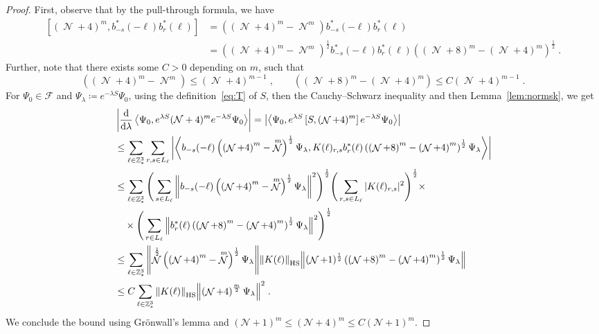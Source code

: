 \documentclass[12pt,a4paper]{article}
\numberwithin{equation}{section}
\newcommand{\cF}{\mathcal{F}}
\newcommand{\cN}{\mathcal{N}}
\newcommand{\1}{\mathbb{I}}
\newcommand{\di}{\textnormal{d}}
\newcommand{\HS}{\mathrm{HS}}
\DeclareMathOperator{\NN}{\mathcal{N}}
\newcommand{\half}{\frac{1}{2}}
\newcommand{\eva}[1]{\left\langle #1 \right\rangle}
\theoremstyle{plain}
\theoremstyle{definition}
\theoremstyle{remark}
\theoremstyle{plain}
\theoremstyle{definition}
\theoremstyle{remark}
\begin{document}
\begin{proof}
First, observe that by the pull-through formula, we have
\begin{align}
	\left[(\NN+4)^m, b^*_{-s}(-\ell)b^*_{r}(\ell)\right] &= \left( (\NN+4)^m - \NN^m \right) b^*_{-s}(-\ell)b^*_{r}(\ell) \nonumber \\
	&= \left( \left(\NN+4\right)^m - \NN^m \right)^\half b^*_{-s}(-\ell)b^*_{r}(\ell) \left( \left(\NN+8\right)^m - \left(\NN+4\right)^m \right)^\half \;.
\end{align}
Further, note that there exists some $ C > 0 $ depending on $ m $, such that
\begin{equation}
	\left( \left(\NN+4\right)^m - \NN^m \right)
	\leq \left(\NN+4\right)^{m-1} \;, \qquad
	\left( \left(\NN+8\right)^m - \left(\NN+4\right)^m \right)
	\leq C \left(\NN+4\right)^{m-1} \;.
\end{equation}
For $ \Psi_0 \in \cF $ and $ \Psi_\lambda \coloneq e^{-\lambda S} \Psi_0 $, using the definition~\eqref{eq:T} of $ S $, then the Cauchy--Schwarz inequality and then Lemma~\ref{lem:normsk}, we get
\begin{align}
	&\left|\frac{\di}{\di\lambda}\eva{\Psi_0, e^{\lambda S} (\mathcal{N}+4)^m e^{-\lambda S} \Psi_0 }\right|
	= \left| \eva{\Psi_0, e^{\lambda S} \left[S, (\NN+4)^m\right] e^{-\lambda S} \Psi_0}\right|\nonumber\\
	&\leq \sum\limits_{\ell\in \mathbb{Z}^3_*}
		\sum\limits_{r,s\in L_\ell} \abs{\eva{ b_{-s}(-\ell) \left( \left(\NN+4\right)^m - \NN^m \right)^\half \Psi_\lambda, K(\ell)_{r,s} b^*_{r}(\ell) \left( \left(\NN+8\right)^m - \left(\NN+4\right)^m \right)^\half \Psi_\lambda }}\nonumber\\
	&\leq \sum\limits_{\ell\in \mathbb{Z}^3_*}
		\Bigg( \sum\limits_{s\in L_\ell} \norm{ b_{-s}(-\ell) \left( \left(\NN+4\right)^m - \NN^m \right)^\half \Psi_\lambda}^2 \Bigg)^{\half}
		\Bigg( \sum\limits_{r,s\in L_\ell} |K(\ell)_{r,s}|^2 \Bigg)^{\half} \times \nonumber\\
		&\quad \times \Bigg( \sum\limits_{r\in L_\ell} \norm {b^*_{r}(\ell) \left( \left(\NN+8\right)^m - \left(\NN+4\right)^m \right)^\half \Psi_\lambda}^2 \Bigg)^{\half} \nonumber\\
	&\leq \sum\limits_{\ell\in \mathbb{Z}^3_*} 
		\norm{ \NN^\half \left( \left(\NN+4\right)^m - \NN^m \right)^\half \Psi_\lambda}
		\norm{K(\ell)}_{\HS}
		\norm{ (\NN+1)^\half \left( \left(\NN+8\right)^m - \left(\NN+4\right)^m \right)^\half \Psi_\lambda } \nonumber\\
	&\leq C \sum\limits_{\ell\in \mathbb{Z}^3_*}
		\norm{K(\ell)}_{\HS}
		\norm{ \left(\NN+4\right)^\frac{m}{2} \Psi_\lambda}^2 \;.
\end{align}
We conclude the bound using Gr\"onwall's lemma and $ (\cN+1)^m \le (\cN+4)^m \le C (\cN+1)^m $.
\end{proof}
\end{document}
